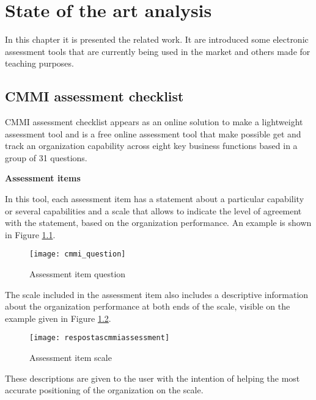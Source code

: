 \chapter{State of the art analysis}\label{chap:chap3}

In this chapter it is presented the related work. It are introduced  some electronic assessment tools that are currently being used in the market and others made for teaching purposes.

\section{CMMI assessment checklist}\label{cmmicheck}

CMMI assessment checklist \citep{capabilityassess} appears as an online solution to make a lightweight assessment tool and is a free online assessment tool that make possible get and track an organization capability across eight key business functions based in a group of 31 questions.


\textbf{Assessment items}

In this tool, each assessment item has a statement about a particular capability or several capabilities and a scale that allows to indicate the level of agreement with the statement, based on the organization performance. An example is shown in Figure \ref{fig:cmmi_question}.

\begin{figure}[h]
	\begin{center}
		\leavevmode
		\texttt{[image: cmmi\_question]}
		\caption{Assessment item question}
		\label{fig:cmmi_question}
	\end{center}
\end{figure}

The scale included in the assessment item also includes a descriptive information about the organization performance at both ends of the scale, visible on the example given in Figure \ref{fig:assesment_answer}.

\begin{figure}[h]
	\begin{center}
		\leavevmode
		\texttt{[image: respostascmmiassessment]}
		\caption{Assessment item scale}
		\label{fig:assesment_answer}
	\end{center}
\end{figure}

These descriptions are given to the user with the intention of helping the most accurate positioning of the organization on the scale.


